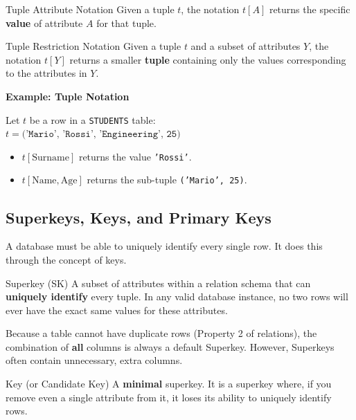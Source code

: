 \begin{defbox}{Tuple Attribute Notation}
Given a tuple $t$, the notation $t[A]$ returns the specific \textbf{value} of attribute $A$ for that tuple.
\end{defbox}

\begin{defbox}{Tuple Restriction Notation}
Given a tuple $t$ and a subset of attributes $Y$, the notation $t[Y]$ returns a smaller \textbf{tuple} containing only the values corresponding to the attributes in $Y$.
\end{defbox}

\vspace{0.2cm}
\begin{example}{\textbf{Example: Tuple Notation}}

Let $t$ be a row in a \texttt{STUDENTS} table:\\
$t = \texttt{('Mario', 'Rossi', 'Engineering', 25)}$\\
\begin{itemize}
    \item $t[\text{Surname}]$ returns the value \texttt{'Rossi'}.
    \item $t[\text{Name}, \text{Age}]$ returns the sub-tuple \texttt{('Mario', 25)}.
\end{itemize}
\end{example}

\subsection{Superkeys, Keys, and Primary Keys}
A database must be able to uniquely identify every single row. It does this through the concept of keys.

\begin{defbox}{Superkey (SK)}
A subset of attributes within a relation schema that can \textbf{uniquely identify} every tuple. In any valid database instance, no two rows will ever have the exact same values for these attributes.
\end{defbox}

Because a table cannot have duplicate rows (Property 2 of relations), the combination of \textbf{all} columns is always a default Superkey. However, Superkeys often contain unnecessary, extra columns. 

\begin{defbox}{Key (or Candidate Key)}
A \textbf{minimal} superkey. It is a superkey where, if you remove even a single attribute from it, it loses its ability to uniquely identify rows.
\end{defbox}

